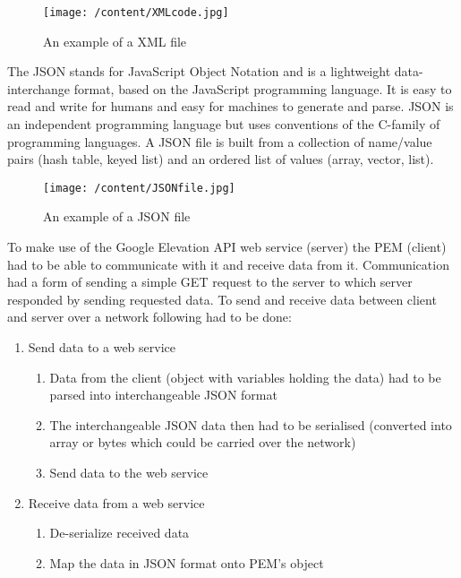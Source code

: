 \documentclass[12pt, a4paper]{report}   %
\begin{document}
\begin{enumerate}
\begin{figure}[H]
  \centering
	\texttt{[image: /content/XMLcode.jpg]}
	  \caption{An example of a XML file}
\end{figure}


The JSON stands for JavaScript Object Notation and is a lightweight data-interchange format, based on the JavaScript programming language. It is easy to read and write for humans and easy for machines to generate and parse. JSON is an independent programming language but uses conventions of the C-family of programming languages. A JSON file is built from a collection of name/value pairs (hash table, keyed list) and an ordered list of values (array, vector, list).


\begin{figure}[H]
  \centering
	\texttt{[image: /content/JSONfile.jpg]}
	  \caption{An example of a JSON file}
\end{figure}


To make use of the Google Elevation API web service (server) the PEM (client) had to be able to communicate with it and receive data from it. Communication had a form of sending a simple GET request to the server to which server responded by sending requested data. To send and receive data between client and server over a network following had to be done:\\

\begin{enumerate}
	\item Send data to a web service
	\begin{enumerate}
		\item Data from the client (object with variables holding the data) had to be parsed into interchangeable JSON format
		\item The interchangeable JSON data then had to be serialised (converted into array or bytes which could be carried over the network)
		\item Send data to the web service\\
	\end{enumerate}

	\item Receive data from a web service
	\begin{enumerate}
		\item De-serialize received data
		\item Map the data in JSON format onto PEM's object\\
	\end{enumerate}
\end{enumerate}


\end{enumerate}
\end{document}
